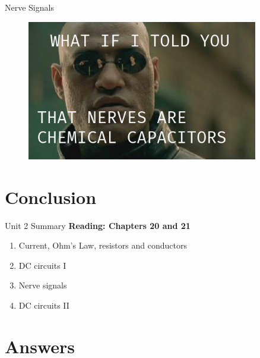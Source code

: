 \documentclass{beamer}
\begin{document}
\begin{frame}{Nerve Signals}
\begin{figure}
\centering
\includegraphics[width=0.9\textwidth]{figures/Matrix-Morpheus.png}
\end{figure}
\end{frame}

\section{Conclusion}

\begin{frame}{Unit 2 Summary}
\textbf{Reading: Chapters 20 and 21}
\begin{enumerate}
\item Current, Ohm's Law, resistors and conductors
\item DC circuits I
\item Nerve signals
\item \alert{DC circuits II}
\end{enumerate}
\end{frame}

\section{Answers}
\end{document}
